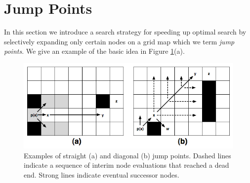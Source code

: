 \section{Jump Points}
In this section we introduce a search strategy for speeding up
optimal search by selectively expanding only certain nodes on a grid map
which we term \emph{jump points}.
We give an example of the basic idea in Figure \ref{fig:jumppoints}(a).

\begin{figure}[tb]
       \begin{center}
		   \includegraphics[width=0.95\columnwidth, trim = 10mm 10mm 10mm 0mm]
			{diagrams/jumppoints.png}
       \end{center}
	\vspace{-3pt}
       \caption{Examples of straight (a) and diagonal (b) jump points.
Dashed lines indicate a sequence of interim node evaluations that reached
a dead end. Strong lines indicate eventual successor nodes.}
       \label{fig:jumppoints}
\end{figure}

